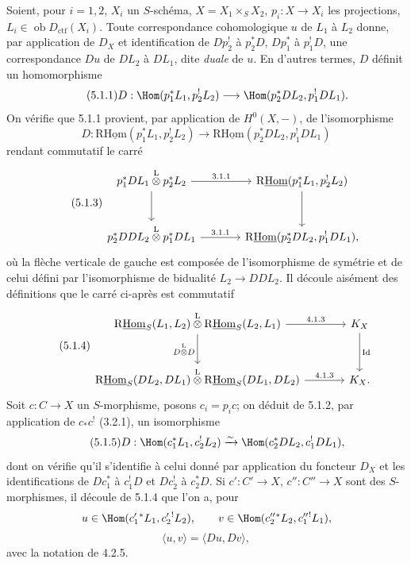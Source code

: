 Soient, pour $i=1,2$, $X_i$ un $S$-schéma, $X=X_1\times_S X_2$, $p_i:X\to X_i$ les projections, $L_i\in\operatorname{ob}D_{\mathrm{ctf}}(X_i)$. Toute correspondance cohomologique $u$ de $L_1$ à $L_2$ donne, par application de $D_X$ et identification de $Dp_2^!$ à $p_2^*D$, $Dp_1^*$ à $p_1^!D$, une correspondance $Du$ de $DL_2$ à $DL_1$, dite \emph{duale} de $u$. En d'autres termes, $D$ définit un homomorphisme
\begin{equation}
\tag{5.1.1}
D:\Hom(p_1^*L_1,p_2^!L_2)\longrightarrow \Hom(p_2^*DL_2,p_1^!DL_1).
\end{equation}
On vérifie que 5.1.1 provient, par application de $H^0(X,-)$, de l'isomorphisme
\begin{equation}
\tag{5.1.2}
D:\mathrm{R}\underline{\mathrm{Hom}}(p_1^*L_1,p_2^!L_2)\longrightarrow\mathrm{R}\underline{\mathrm{Hom}}(p_2^*DL_2,p_1^!DL_1)
\end{equation}
rendant commutatif le carré
\begin{equation}
\tag{5.1.3}
\begin{tikzcd}[column sep=large,row sep=large]
p_1^*DL_1\overset{\mathrm{L}}{\otimes}p_2^*L_2 \arrow[r,"3.1.1"] \arrow[d]
& \mathrm{R}\underline{\mathrm{Hom}}(p_1^*L_1,p_2^!L_2) \arrow[d] \\
p_2^*DDL_2\overset{\mathrm{L}}{\otimes}p_1^*DL_1 \arrow[r,"3.1.1"]
& \mathrm{R}\underline{\mathrm{Hom}}(p_2^*DL_2,p_1^!DL_1),
\end{tikzcd}
\end{equation}
où la flèche verticale de gauche est composée de l'isomorphisme de symétrie et de celui défini par l'isomorphisme de bidualité $L_2\to DDL_2$. Il découle aisément des définitions que le carré ci-après est commutatif
\begin{equation}
\tag{5.1.4}
\begin{tikzcd}[column sep=large,row sep=large]
\mathrm{R}\underline{\mathrm{Hom}}_S(L_1,L_2)\overset{\mathrm{L}}{\otimes}\mathrm{R}\underline{\mathrm{Hom}}_S(L_2,L_1) \arrow[r,"4.1.3"] \arrow[d,"D\overset{\mathrm{L}}{\otimes} D"']
& K_X \arrow[d,"\operatorname{Id}"] \\
\mathrm{R}\underline{\mathrm{Hom}}_S(DL_2,DL_1)\overset{\mathrm{L}}{\otimes}\mathrm{R}\underline{\mathrm{Hom}}_S(DL_1,DL_2) \arrow[r,"4.1.3"]
& K_X.
\end{tikzcd}
\end{equation}
Soit $c:C\to X$ un $S$-morphisme, posons $c_i=p_ic$; on déduit de 5.1.2, par application de $c_*c^!$ (3.2.1), un isomorphisme
\begin{equation}
\tag{5.1.5}
D:\Hom(c_1^*L_1,c_2^!L_2)\xrightarrow{\sim}\Hom(c_2^*DL_2,c_1^!DL_1),
\end{equation}
dont on vérifie qu'il s'identifie à celui donné par application du foncteur $D_X$ et 
les
identifications de $Dc_1^*$ à $c_1^!D$ et $Dc_2^!$ à $c_2^*D$. Si $c':C'\to X$, $c'':C''\to X$ sont des $S$-morphismes, il découle de 5.1.4 que l'on a, pour
\[
u\in\Hom(c_1'{}^*L_1,c_2'{}^!L_2),\qquad v\in\Hom(c_2''{}^*L_2,c_1''{}^!L_1),\]
\begin{equation}
\tag{5.1.6}
\langle u,v\rangle=\langle Du,Dv\rangle,
\end{equation}
avec la notation de 4.2.5.

